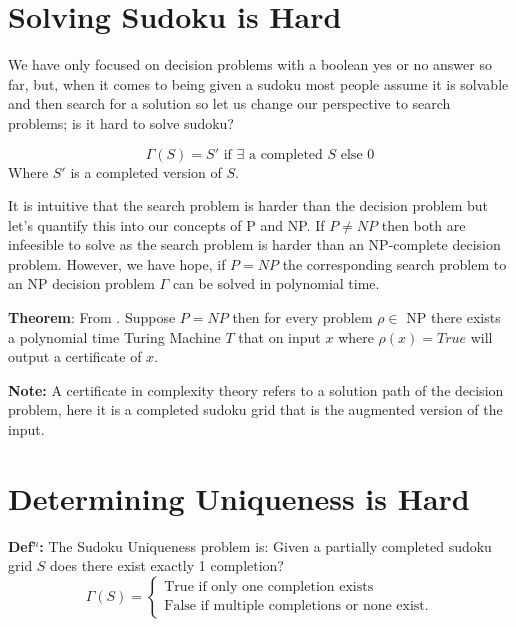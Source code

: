 \documentclass[a4paper,11pt]{report}
\begin{document}
\section{Solving Sudoku is Hard}

We have only focused on decision problems with a boolean yes or no answer so far, but, when it comes to being given a sudoku most people assume it is solvable and then search for a solution so let us change our perspective to search problems; is it hard to solve sudoku? 

\begin{equation}
\Gamma(S) =  S' \text{ if $\exists$ a completed $S$ else 0}
\end{equation}
Where $S'$ is a completed version of $S$.

It is intuitive that the search problem is harder than the decision problem but let's quantify this into our concepts of P and NP. If $P \neq NP$ then both are infeesible to solve as the search problem is harder than an NP-complete decision problem. However, we have hope, if $P=NP$ the corresponding search problem to an NP decision problem $\Gamma$ can be solved in polynomial time. 

\textbf{Theorem}: From \cite{compcomplexityamodernapproach}. Suppose $P=NP$ then for every problem $\rho\in$ NP there exists a polynomial time Turing Machine $T$ that on input $x$ where $\rho(x)=True$ will output a certificate of $x$.

\textbf{Note:} A certificate in complexity theory refers to a solution path of the decision problem, here it is a completed sudoku grid that is the augmented version of the input. 


\section{Determining Uniqueness is Hard}

\textbf{Def$^n$:} The Sudoku Uniqueness problem is: Given a partially completed sudoku grid $S$ does there exist exactly 1 completion?
		\begin{equation}
		        \Gamma (S) = \begin{cases}
		            \text{True if only one completion exists} \\
		            \text{False if multiple completions or none exist}.
				\end{cases}
		\end{equation}
\end{document}
